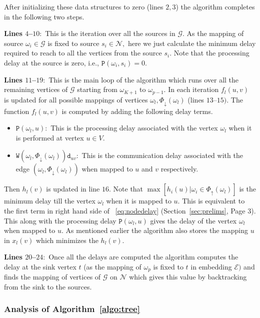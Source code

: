\documentclass[journal]{IEEEtran}
\newcommand{\net}{\mathcal{N}}
\newcommand{\netnodes}{V}
\newcommand{\compgraph}{\mathcal{G}}
\newcommand{\prenodes}[1]{\Phi_{\uparrow}(#1)}
\newcommand{\sucnodes}[1]{\Phi_{\downarrow}(#1)}
\newcommand{\distance}{\mathtt{d}} \newcommand{\edgewt}{\mathtt{W}} \newcommand{\processingwt}{\mathtt{P}}
\newcommand{\embedding}{\mathcal{E}}
\begin{document}
After initializing these data structures to zero (lines $2,3$) the
algorithm completes in the following two steps.

\textbf{Lines $4$--$10:$} This is the iteration over all the sources in
  $\compgraph.$ As the mapping of source $\omega_i \in \compgraph$ is
  fixed to source $s_i \in \net,$ here we just calculate the minimum
  delay required to reach to all the vertices from the source $s_i.$
  Note that the processing delay at the source is zero, i.e.,
  $\processingwt(\omega_i,s_i) =0.$
  
\textbf{Lines $11$--$19:$} This is the main loop of the algorithm which
  runs over all the remaining vertices of $\compgraph$ starting from
  $\omega_{K+1}$ to $\omega_{p-1}.$ In each iteration $f_l(u,v)$ is
  updated for all possible mappings of vertices
  $\omega_{l},\sucnodes{\omega_{l}}$ (lines $13$--$15)$. The function
  $f_l(u,v)$ is computed by adding the following delay terms.
\begin{itemize}
  \item $\processingwt(\omega_{l},u):$ This is the processing delay
    associated with the vertex $\omega_{l}$ when it is performed at
    vertex $u \in\netnodes.$
  \item $\edgewt(\omega_{l},\sucnodes{\omega_{l}})\distance_{uv}:$
    This is the communication delay associated with the edge
    $(\omega_{l},\sucnodes{\omega_{l}})$ when mapped to $u$ and $v$
    respectively.
 \end{itemize}
Then $h_l(v)$ is updated in line $16.$ Note that
 $\max[h_i(u)|\omega_i \in \prenodes{\omega_l}]$ is the minimum delay
 till the vertex $\omega_{l}$ when it is mapped to $u.$ This is
 equivalent to the first term in right hand side of
 ~\eqref{eq:nodedelay} (Section~\ref{sec:prelims}, Page 3). This along
 with the processing delay $\processingwt(\omega_{l},u)$ gives the
 delay of the vertex $\omega_{l}$ when mapped to $u.$ As mentioned
 earlier the algorithm also stores the mapping $u$ in $x_l(v)$ which
 minimizes the $h_l(v).$
 
\textbf{Lines $20$--$24:$} Once all the delays are computed the algorithm
  computes the delay at the sink vertex $t$ (as the mapping of
  $\omega_p$ is fixed to $t$ in embedding $\embedding)$ and finds the
  mapping of vertices of $\compgraph$ on $\net$ which gives this value
  by backtracking from the sink to the sources.


\subsubsection{Analysis of Algorithm~\ref{algo:tree}}
\end{document}
